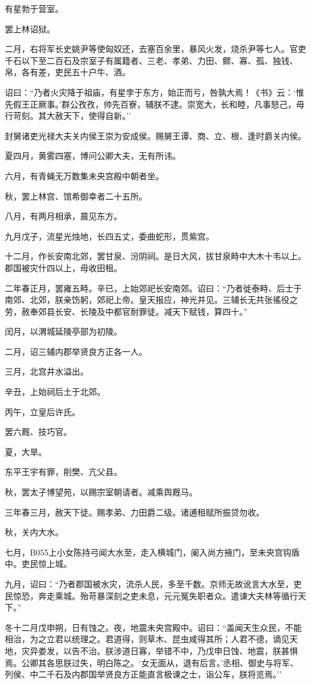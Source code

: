 \documentclass[]{article}
\begin{document}
有星勃于营室。

罢上林诏狱。

二月，右将军长史姚尹等使匈奴还，去塞百余里，暴风火发，烧杀尹等七人。官吏千石以下至二百石及宗室子有属籍者、三老、孝弟、力田、鳏、寡、孤、独钱、帛，各有差，吏民五十户牛、酒。

诏曰：``乃者火灾降于祖庙，有星孛于东方，始正而亏，咎孰大焉！《书》云：`惟先假王正厥事。'群公孜孜，帅先百寮，辅朕不逮。崇宽大，长和睦，凡事怒己，毋行苛刻。其大赦天下，使得自新。''

封舅诸吏光禄大夫关内侯王崇为安成侯。赐舅王谭、商、立、根、逢时爵关内侯。

夏四月，黄雾四塞，博问公卿大夫，无有所讳。

六月，有青蝇无万数集未央宫殿中朝者坐。

秋，罢上林宫、馆希御幸者二十五所。

八月，有两月相承，晨见东方。

九月戊子，流星光烛地，长四五丈，委曲蛇形，贯紫宫。

十二月，作长安南北郊，罢甘泉、汾阴祠。是日大风，拔甘泉畤中大木十韦以上。郡国被灾什四以上，毋收田租。

二年春正月，罢雍五畤。辛已，上始郊祀长安南郊。诏曰：``乃者徙泰畤、后士于南郊、北郊，朕亲饬躬，郊祀上帝。皇天报应，神光并见。三辅长无共张徭役之劳，赦奉郊县长安、长陵及中都官耐罪徒。减天下赋钱，算四十。''

闰月，以渭城延陵亭部为初陵。

二月，诏三辅内郡举贤良方正各一人。

三月，北宫井水溢出。

辛丑，上始祠后土于北郊。

丙午，立皇后许氏。

罢六厩、技巧官。

夏，大旱。

东平王宇有罪，削樊、亢父县。

秋，罢太子博望苑，以赐宗室朝请者。减乘舆厩马。

三年春三月，赦天下徒。赐孝弟、力田爵二级。诸逋租赋所振贷勿收。

秋，关内大水。

七月，B055上小女陈持弓闻大水至，走入横城门，阑入尚方掖门，至未央宫钩盾中。吏民惊上城。

九月，诏曰：``乃者郡国被水灾，流杀人民，多至千数。京师无故讹言大水至，吏民惊恐，奔走乘城。殆苛暴深刻之吏未息，元元冤失职者众。遣谏大夫林等循行天下。''

冬十二月戊申朔，日有蚀之。夜，地震未央宫殿中。诏曰：``盖闻天生众民，不能相治，为之立君以统理之。君道得，则草木、昆虫咸得其所；人君不德，谪见天地，灾异娄发，以告不治。朕涉道日寡，举错不中，乃戊申日蚀、地震，朕甚惧焉。公卿其各思朕过失，明白陈之。`女无面从，退有后言。'丞相、御史与将军、列侯、中二千石及内郡国举贤良方正能直言极谏之士，诣公车，朕将览焉。''
\end{document}
